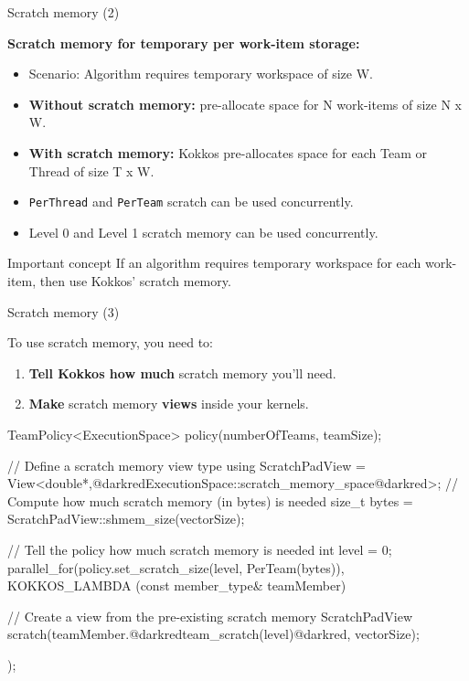 \begin{frame}[fragile]{Scratch memory (2)}

  \textbf{Scratch memory for temporary per work-item storage:}

  \begin{itemize}
    \item{Scenario: Algorithm requires temporary workspace of size W.}
    \item{\textbf{Without scratch memory:} pre-allocate space for N work-items of size N x W.}
    \item{\textbf{With scratch memory:} Kokkos pre-allocates space for each Team or Thread of size T x W.}
    \item{\texttt{PerThread} and \texttt{PerTeam} scratch can be used concurrently.}
    \item{Level 0 and Level 1 scratch memory can be used concurrently.}
  \end{itemize}

  \pause

  \begin{block}{Important concept}
    If an algorithm requires temporary workspace for each work-item, then use Kokkos' scratch memory.
  \end{block}

\end{frame}


\begin{frame}[fragile]{Scratch memory (3)}

  To use scratch memory, you need to:
  \begin{enumerate}
    \item{\textbf{Tell Kokkos how much} scratch memory you'll need.}
    \item{\textbf{Make} scratch memory \textbf{views} inside your kernels.}
  \end{enumerate}

  \pause
  \begin{code}
  TeamPolicy<ExecutionSpace> policy(numberOfTeams, teamSize);

  // Define a scratch memory view type
  using ScratchPadView =
      View<double*,@darkredExecutionSpace::scratch_memory_space@darkred>;
  // Compute how much scratch memory (in bytes) is needed
  size_t bytes = ScratchPadView::shmem_size(vectorSize);

  // Tell the policy how much scratch memory is needed
  int level = 0;
  parallel_for(policy.set_scratch_size(level, PerTeam(bytes)),
    KOKKOS_LAMBDA (const member_type& teamMember) {

      // Create a view from the pre-existing scratch memory
      ScratchPadView scratch(teamMember.@darkredteam_scratch(level)@darkred,
                             vectorSize);
  });
  \end{code}
\end{frame}

